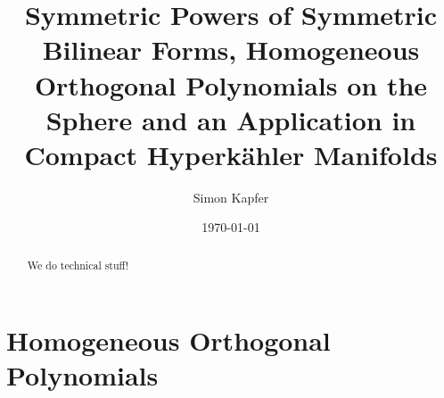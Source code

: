\documentclass{amsart}
\theoremstyle{plain}
\theoremstyle{definition}
\theoremstyle{remark}
\begin{document}
\title[Symmetric Powers, Hom.~Orth.~Polynomials, Hyperk\"ahlers]{Symmetric Powers of Symmetric Bilinear Forms, Homogeneous Orthogonal Polynomials on the Sphere and an Application in Compact Hyperk\"ahler Manifolds}


\author{Simon Kapfer}
\address{Simon Kapfer, Laboratoire de Math\'ematiques et Applications, UMR CNRS 6086, Universit\'e de Poitiers, T\'el\'eport 2, Boulevard Marie et Pierre Curie, F-86962 Futuroscope Chasseneuil}


\date{\today}


\begin{abstract} 
We do technical stuff!
\end{abstract}

\maketitle


\section{Homogeneous Orthogonal Polynomials}
\end{document}
